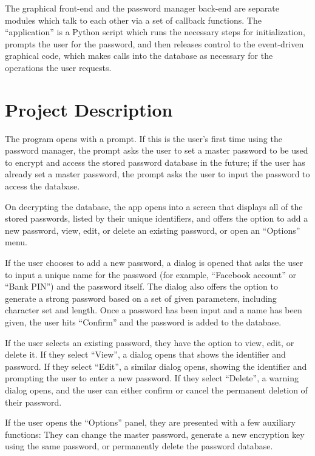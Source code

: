 \documentclass [oneside, letterpaper] {article}
\begin{document}
        The graphical front-end and the password manager back-end are separate
        modules which talk to each other via a set of callback functions. The
        ``application'' is a Python script which runs the necessary steps for
        initialization, prompts the user for the password, and then releases
        control to the event-driven graphical code, which makes calls into the
        database as necessary for the operations the user requests.

    \section {Project Description}
        The program opens with a prompt. If this is the user's first time using
        the password manager, the prompt asks the user to set a master password
        to be used to encrypt and access the stored password database in the
        future; if the user has already set a master password, the prompt asks
        the user to input the password to access the database.

        On decrypting the database, the app opens into a screen that displays
        all of the stored passwords, listed by their unique identifiers, and
        offers the option to add a new password, view, edit, or delete an
        existing password, or open an ``Options'' menu.

        If the user chooses to add a new password, a dialog is opened that
        asks the user to input a unique name for the password (for example,
        ``Facebook account'' or ``Bank PIN'') and the password itself. The
        dialog also offers the option to generate a strong password based on a
        set of given parameters, including character set and length. Once a
        password has been input and a name has been given, the user hits
        ``Confirm'' and the password is added to the database.

        If the user selects an existing password, they have the option to view,
        edit, or delete it. If they select ``View'', a dialog opens that shows
        the identifier and password. If they select ``Edit'', a similar dialog
        opens, showing the identifier and prompting the user to enter a new
        password. If they select ``Delete'', a warning dialog opens, and the
        user can either confirm or cancel the permanent deletion of their
        password.

        If the user opens the ``Options'' panel, they are presented with a few
        auxiliary functions: They can change the master password, generate a
        new encryption key using the same password, or permanently delete the
        password database.
\end{document}
